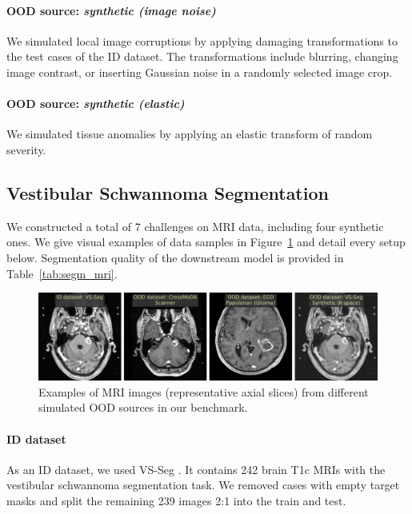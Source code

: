 \paragraph{OOD source: \textit{synthetic (image noise)}}
We simulated local image corruptions by applying damaging transformations to the test cases of the ID dataset. The transformations include blurring, changing image contrast, or inserting Gaussian noise in a randomly selected image crop.

\paragraph{OOD source: \textit{synthetic (elastic)}}
We simulated tissue anomalies by applying an elastic transform of random severity.


\subsection{Vestibular Schwannoma Segmentation}

We constructed a total of 7 challenges on MRI data, including four synthetic ones. We give visual examples of data samples in Figure~\ref{fig:mri} and detail every setup below. Segmentation quality of the downstream model is provided in Table~\ref{tab:segm_mri}.

\begin{figure}[h]
	\centering
	\includegraphics[width=\textwidth]{Dissertation/Figures/5_ood_bench/mri_examples_2.pdf}
	\caption{Examples of MRI images (representative axial slices) from different simulated OOD sources in our benchmark.}
	\label{fig:mri}
\end{figure}



\paragraph{ID dataset}
As an ID  dataset, we used VS-Seg \cite{shapey2021segmentation}. It contains 242 brain T1c MRIs with the vestibular schwannoma segmentation task. We removed cases with empty target masks and split the remaining 239 images 2:1 into the train and test.


